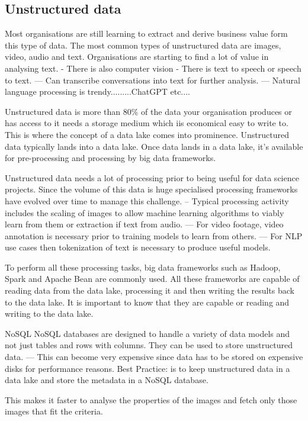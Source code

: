 \documentclass[a4paper, 11pt]{article}
\begin{document}
    \subsection{Unstructured data}
    Most organisations are still learning to extract and derive business value form this type of data.
    The most common types of unstructured data are images, video, audio and text.
    Organisations are starting to find a lot of value in analysing text.
    - There is also computer vision
    - There is text to speech or speech to text.
    --- Can transcribe conversations into text for further analysis.
    --- Natural language processing is trendy.........ChatGPT etc....

    Unstructured data is more than 80\% of the data your organisation produces or has access to it needs a storage medium which iis economical easy to write to.
    This is where the concept of a data lake comes into prominence.
    Unstructured data typically lands into a data lake.
    Once data lands in a data lake, it's available for pre-processing and processing by big data frameworks.

    Unstructured data needs a lot of processing prior to being useful for data science projects.
    Since the volume of this data is huge specialised processing frameworks have evolved over time to manage this challenge.
    -- Typical processing activity includes the scaling of images to allow machine learning algorithms to viably learn from them or extraction if text from audio.
    --- For video footage, video annotation is necessary prior to training models to learn from others.
    --- For NLP use cases then tokenization of text is necessary to produce useful models.

    To perform all these processing tasks, big data frameworks such as Hadoop, Spark and Apache Bean are commonly used.
    All these frameworks are capable of reading data from the data lake, processing it and then writing the results back to the data lake.
    It is important to know that they are capable or reading and writing to the data lake.

    NoSQL
    NoSQL databases are designed to handle a variety of data models and not just tables and rows with columns.
    They can be used to store unstructured data.
    --- This can become very expensive since data has to be stored on expensive disks for performance reasons.
    Best Practice: is to keep unstructured data in a data lake and store the metadata in a NoSQL database.

    This makes it faster to analyse the properties of the images and fetch only those images that fit the criteria.
\end{document}
